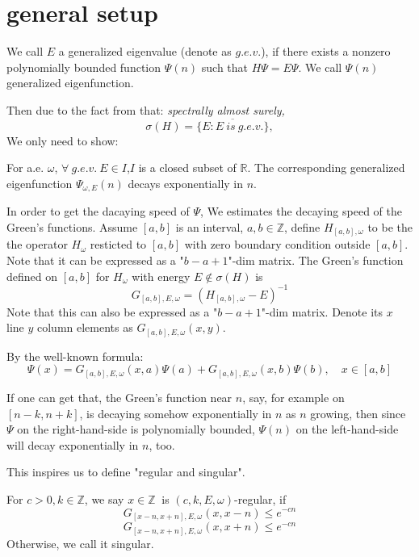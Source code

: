 \section{general setup}

\begin{definition}[$g.e.v.$]
    We call $E$ a generalized eigenvalue (denote as $g.e.v.$), if there exists a nonzero polynomially bounded function $\Psi(n)$ such that $H\Psi=E\Psi$. We call $\Psi(n)$ generalized eigenfunction.
\end{definition}
Then due to the fact from \cite{simon1982schrodinger} that:
\textit{spectrally almost surely,
\[
\sigma(H)=\overline{\{E:E~is~g.e.v.\}},
\]}
We only need to show:
\begin{thm}\label{thm1}
  For a.e. $\omega$, $\forall~g.e.v.~E\in I$,$I$ is a closed subset of $\mathbb{R}$. The corresponding generalized eigenfunction $\Psi_{\omega,E}(n)$ decays exponentially in $n$.
\end{thm}

In order to get the dacaying speed of $\Psi$, We estimates the decaying speed of the Green's functions. Assume $[a,b]$ is an interval, $a,b\in\mathbb{Z}$, define $H_{[a,b],\omega}$ to be the the operator $H_\omega$ resticted to $[a,b]$ with zero boundary condition outside $[a,b]$. Note that it can be expressed as a "$b-a+1$"-dim matrix.
The Green's function defined on $[a,b]$ for $H_\omega$ with energy $E\notin\sigma(H)$ is
  \[
    G_{[a,b],E,\omega}=(H_{[a,b],\omega}-E)^{-1}
  \]
Note that this can also be expressed as a "$b-a+1$"-dim matrix. Denote its $x$ line $y$ column elements as $G_{[a,b],E,\omega}(x,y)$.

By the well-known formula:
  \begin{equation}\label{possion}
    \Psi(x)=G_{[a,b],E,\omega}(x,a)\Psi(a)+G_{[a,b],E,\omega}(x,b)\Psi(b),\quad x\in[a,b]
  \end{equation}

If one can get that, the Green's function near $n$, say, for example on $[n-k,n+k]$, is decaying somehow exponentially in $n$ as $n$ growing, then since $\Psi$ on the  right-hand-side is polynomially bounded, $\Psi(n)$ on the left-hand-side will decay exponentially in $n$, too.

This inspires us to define "regular and singular".

\begin{definition}
   For $c>0, k\in\mathbb{Z}$, we say $x\in\mathbb{Z}~$ is $(c,k,E,\omega)$-regular, if
  \[
    G_{[x-n,x+n],E,\omega}(x,x-n) \leq e^{-cn}
  \]
  \[
    G_{[x-n,x+n],E,\omega}(x,x+n) \leq e^{-cn}
  \]
  Otherwise, we call it singular.
\end{definition}

